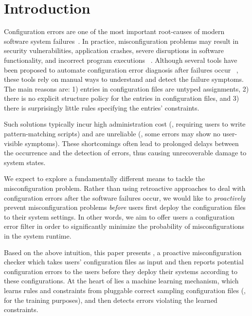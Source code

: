 \section{Introduction}
\label{sec:Intro}

Configuration errors are one of the most important root-causes of 
modern software system failures~\cite{xu15systems,yin11anempirical}. 
In practice, misconfiguration problems may result in 
security vulnerabilities,
application crashes, severe disruptions in software functionality,
and incorrect program executions%
~\cite{xu15systems,zhang14encore,yuan11context}.
Although several tools have been proposed to automate configuration
error diagnosis after failures occur%
~\cite{wang04automatic,attariyan10automating,%
su07autobash,whitaker04configuration}, 
these tools rely on manual ways to understand and detect the failure 
symptoms. The main reasons are:
1) entries in configuration files are untyped assignments, 
2) there is no explicit structure policy for the entries in 
configuration files, and 3) there is surprisingly little rules 
specifying the entries' constraints.

Such solutions typically incur high administration cost (\eg, 
requiring users to write pattern-matching scripts) 
and are unreliable (\eg, some errors may show no user-visible symptoms).
These shortcomings often lead to prolonged delays between
the occurrence and the detection of errors, thus causing unrecoverable
damage to system states.

We expect to explore a fundamentally different means to tackle 
the misconfiguration problem. Rather than using retroactive approaches
to deal with configuration errors after the software failures occur, 
we would like to {\em proactively} prevent misconfiguration problems 
{\em before} users first deploy the configuration files to 
their system settings. In other words, we aim to offer users 
a configuration error filter in order to significantly minimize 
the probability of misconfigurations in the system runtime.

Based on the above intuition, this paper presents \app, 
a proactive misconfiguration checker which takes users' 
configuration files as input and then reports potential configuration 
errors to the users before they deploy their systems 
according to these configurations.
At the heart of \app lies a machine learning mechanism, 
which learns rules and constraints from pluggable 
correct sampling configuration files (\ie, for the training purposes), 
and then detects errors violating the learned constraints.

